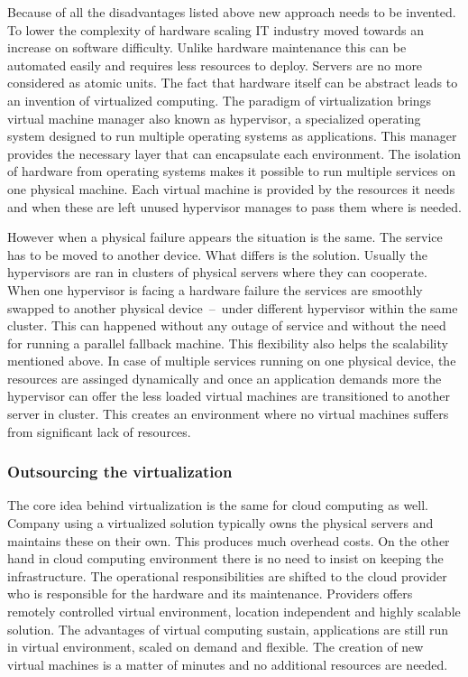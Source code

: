 Because of all the disadvantages listed above new approach needs to be invented. To lower the complexity of hardware scaling IT industry moved towards an increase on software difficulty. Unlike hardware maintenance this can be automated easily and requires less resources to deploy. Servers are no more considered as atomic units. The fact that hardware itself can be abstract leads to an invention of virtualized computing. The paradigm of virtualization brings virtual machine manager also known as hypervisor, a specialized operating system designed to run multiple operating systems as applications. This manager provides the necessary layer that can encapsulate each environment. The isolation of hardware from operating systems makes it possible to run multiple services on one physical machine. Each virtual machine is provided by the resources it needs and when these are left unused hypervisor manages to pass them where is needed.

However when a physical failure appears the situation is the same. The service has to be moved to another device. What differs is the solution. Usually the hypervisors are ran in clusters of physical servers where they can cooperate. When one hypervisor is facing a hardware failure the services are smoothly swapped to another physical device \,--\, under different hypervisor within the same cluster. This can happened without any outage of service and without the need for running a parallel fallback machine. This flexibility also helps the scalability mentioned above. In case of multiple services running on one physical device, the resources are assinged dynamically and once an application demands more the hypervisor can offer the less loaded virtual machines are transitioned to another server in cluster. This creates an environment where no virtual machines suffers from significant lack of resources.

\subsubsection{Outsourcing the virtualization}
\label{subs:Outsourcing the virtualization}

The core idea behind virtualization is the same for cloud computing as well. Company using a virtualized solution typically owns the physical servers and maintains these on their own. This produces much overhead costs. On the other hand in cloud computing environment there is no need to insist on keeping the infrastructure. The operational responsibilities are shifted to the cloud provider who is responsible for the hardware and its maintenance. Providers offers remotely controlled virtual environment, location independent and highly scalable solution. The advantages of virtual computing sustain, applications are still run in virtual environment, scaled on demand and flexible. The creation of new virtual machines is a matter of minutes and no additional resources are needed.

